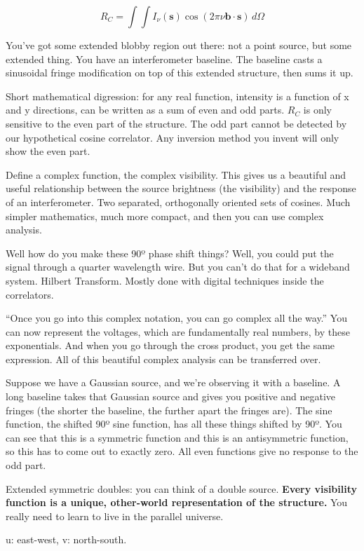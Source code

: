\documentclass[a4paper]{article}
\begin{document}
$$ R_C = \int \int I_\nu (\textbf{s}) \cos (2 \pi \nu \textbf{b} \cdot \textbf{s}) \, d\Omega $$

You've got some extended blobby region out there: not a point source, but some extended thing. You have an interferometer baseline. The baseline casts a sinusoidal fringe modification on top of this extended structure, then sums it up. 

Short mathematical digression: for any real function, intensity is a function of x and y directions, can be written as a sum of even and odd parts. $R_C$ is only sensitive to the even part of the structure. The odd part cannot be detected by our hypothetical cosine correlator. Any inversion method you invent will only show the even part. 

Define a complex function, the complex visibility. This gives us a beautiful and useful relationship between the source brightness (the visibility) and the response of an interferometer. Two separated, orthogonally oriented sets of cosines. Much simpler mathematics, much more compact, and then you can use complex analysis. 

Well how do you make these 90º phase shift things? Well, you could put the signal through a quarter wavelength wire. But you can't do that for a wideband system. Hilbert Transform. Mostly done with digital techniques inside the correlators. 

``Once you go into this complex notation, you can go complex all the way.'' You can now represent the voltages, which are fundamentally real numbers, by these exponentials. And when you go through the cross product, you get the same expression. All of this beautiful complex analysis can be transferred over. 

Suppose we have a Gaussian source, and we're observing it with a baseline. A long baseline takes that Gaussian source and gives you positive and negative fringes (the shorter the baseline, the further apart the fringes are). The sine function, the shifted 90º sine function, has all these things shifted by 90º. You can see that this is a symmetric function and this is an antisymmetric function, so this has to come out to exactly zero. All even functions give no response to the odd part.

Extended symmetric doubles: you can think of a double source. \textbf{Every visibility function is a unique, other-world representation of the structure.} You really need to learn to live in the parallel universe. 

u: east-west, v: north-south. 
\end{document}

